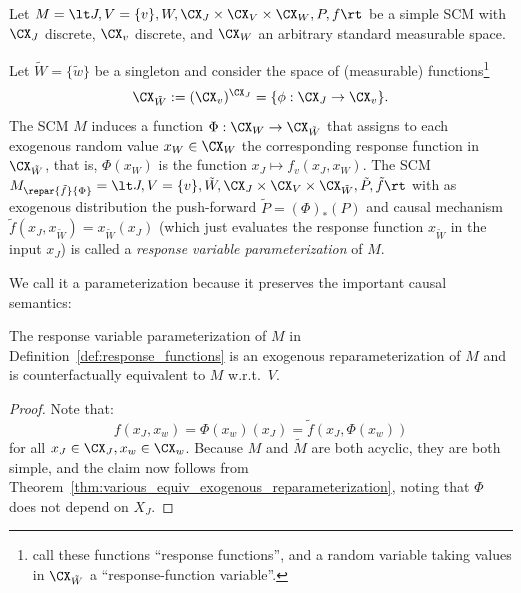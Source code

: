 \begin{Def}\label{def:response_functions}
  Let $M = \lt J, V=\{v\}, W, \CX_J \times \CX_V \times \CX_W, P, f \rt$ be a simple SCM
  with $\CX_J$ discrete, $\CX_v$ discrete, and $\CX_W$ an arbitrary standard measurable space.
  
  Let $\tilde{W} = \{\tilde{w}\}$ be a singleton and consider the space of (measurable) functions\footnote{\cite{BalkePearl1994b} call these functions ``response functions'', and a random variable taking values in $\CX_{\tilde{W}}$ a ``response-function variable''.}
  $$\CX_{\tilde{W}} := (\CX_v)^{\CX_J} = \{\phi : \CX_J \to \CX_v\}.$$
  The SCM $M$ induces a function $\Phi : \CX_W \to \CX_{\tilde{W}}$ that assigns to each exogenous random value $x_W \in \CX_W$ the corresponding response function in $\CX_{\tilde{W}}$, that is, $\Phi(x_W)$ is the function $x_J \mapsto f_v(x_J, x_W)$.
  The SCM $M_{\repar{\tilde{f}}{\Phi}} = \lt J, V=\{v\}, \tilde{W}, \CX_J \times \CX_V \times \CX_{\tilde{W}}, \tilde{P}, \tilde{f} \rt$
  with as exogenous distribution the push-forward $\tilde{P} = (\Phi)_* (P)$ and
  causal mechanism $\tilde{f}(x_J,x_{\tilde{W}}) = x_{\tilde{W}}(x_J)$ (which just evaluates the response function $x_{\tilde{W}}$ in the input $x_J$) is called a \emph{response variable parameterization} of $M$.
\end{Def}
We call it a parameterization because it preserves the important causal semantics:
\begin{Prp}\label{prp:counterfactual_equivalence_response_functions}
  The response variable parameterization of $M$ in Definition~\ref{def:response_functions} is an exogenous reparameterization of $M$ and is
  counterfactually equivalent to $M$ w.r.t.\ $V$.
\end{Prp}
\begin{proof}
  Note that:
    $$f(x_J,x_w) = \Phi(x_w)(x_J) = \tilde{f}(x_J,\Phi(x_w))$$
  for all $x_J \in \CX_J, x_w \in \CX_w$.
  Because $M$ and $\tilde{M}$ are both acyclic, they are both simple, and the claim now follows from Theorem~\ref{thm:various_equiv_exogenous_reparameterization}, noting that $\Phi$ does not depend on $X_J$.
\end{proof}

